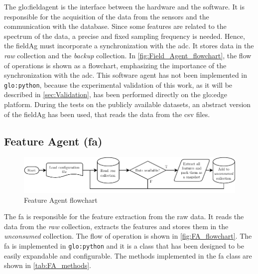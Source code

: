 The \gls{glo:fieldagent} is the interface between the hardware and the software. It is responsible for the acquisition of the data from the sensors and the communication with the database. Since some features are related to the spectrum of the data, a precise and fixed sampling frequency is needed. Hence, the \gls{fieldAg} must incorporate a synchronization with the \gls{adc}. It stores data in the \emph{raw} collection and the \emph{backup} collection. In \autoref{fig:Field_Agent_flowchart}, the flow of operations is shown as a flowchart, emphasizing the importance of the synchronization with the \gls{adc}. This software agent has not been implemented in \texttt{\gls{glo:python}}, because the experimental validation of this work, as it will be described in \autoref{sec:Validation}, has been performed directly on the \gls{glo:edge} platform. During the tests on the publicly available datasets, an abstract version of the \gls{fieldAg} has been used, that reads the data from the \gls{csv} files.


\subsection{Feature Agent (\gls{fa})}
\label{subsec:FeatureAgent}
\begin{figure}
    \centering
    \includegraphics[width=\textwidth]{images/Framework/FA_flowchart.pdf}
    \caption{Feature Agent flowchart}
    \label{fig:FA_flowchart}
\end{figure}

The \gls{fa} is responsible for the feature extraction from the raw data. It reads the data from the \emph{raw} collection, extracts the features and stores them in the \emph{unconsumed} collection. The flow of operation is shown in \autoref{fig:FA_flowchart}. The \gls{fa} is implemented in \texttt{\gls{glo:python}} and it is a class that has been designed to be easily expandable and configurable. The methods implemented in the \gls{fa} class are shown in \autoref{tab:FA_methods}.


